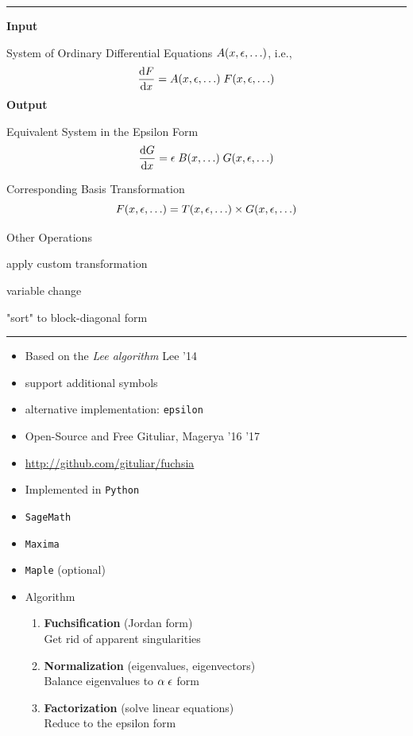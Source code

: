 \documentclass[11pt]{article}
\newcommand{\titleb}[2]{{\color{Blue}{\LARGE #1}\hfill{\Large #2}\vspace{-2mm}\par\rule{\textwidth}{1pt}\vs}}
\newcommand{\titlea}[1]{\titleb{#1}{}}
\newcommand{\people}[1]{{\color{Magenta}#1}}
\begin{document}
\titlea{A few words on \fuchsia}
  {\bf Input}
  \bi
    \item System of Ordinary Differential Equations $A(x,\epsilon,\ldots)$, i.e.,
      $$\frac{\mathrm{d} F}{\mathrm{d} x} = A(x,\epsilon,\ldots) \; F(x,\epsilon,\ldots)$$%
  \ei
  {\bf Output}
  \bi
    \item Equivalent System in the Epsilon Form
      $$\frac{\mathrm{d} G}{\mathrm{d} x} = \epsilon \; B(x,\ldots) \; G(x,\epsilon,\ldots)$$
    \item Corresponding Basis Transformation 
      $$F(x,\epsilon,\ldots) = T(x,\epsilon,\ldots) \times G(x,\epsilon,\ldots)$$
    \item Other Operations
    \bi
      \item apply custom transformation
      \item variable change
      \item "sort" to block-diagonal form
    \ei
  \ei
\newpage


\titlea{A few words on \fuchsia}
  \begin{itemize}
    \item Based on the {\em Lee algorithm} \people{Lee '14}
    \bi
      \item support additional symbols
      \item alternative implementation: \texttt{epsilon}
    \ei
    \item Open-Source and Free \people{Gituliar, Magerya '16 '17}
    \bi
       \item \url{http://github.com/gituliar/fuchsia}
    \ei
    \item Implemented in \texttt{Python}
    \bi
      \item \texttt{SageMath}
      \item \texttt{Maxima}
      \item \texttt{Maple} (optional)
    \ei
    \item Algorithm
    \begin{enumerate}
      \item {\bf Fuchsification} (Jordan form) \\
        Get rid of apparent singularities
      \item {\bf Normalization} (eigenvalues, eigenvectors) \\
        Balance eigenvalues to $\alpha \; \epsilon$ form
      \item {\bf Factorization} (solve linear equations) \\
        Reduce to the epsilon form
    \end{enumerate}
  \end{itemize}
\newpage
\end{document}
